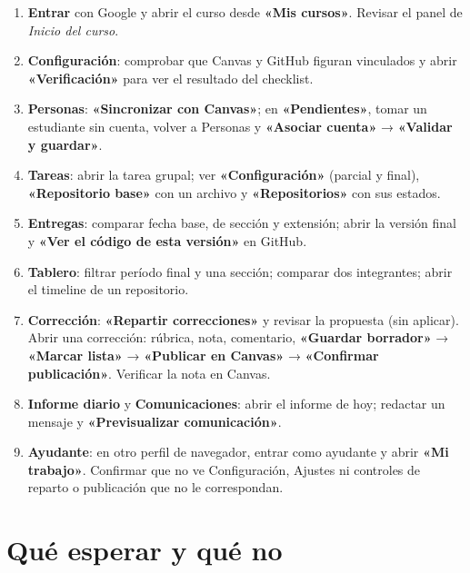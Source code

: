 \documentclass[11pt,a4paper]{article}
\newcommand{\ui}[1]{\textbf{«#1»}}        %
\begin{document}
\begin{enumerate}[label=\arabic*., itemsep=4pt]
  \item \textbf{Entrar} con Google y abrir el curso desde \ui{Mis cursos}. Revisar el panel de \emph{Inicio del curso}.
  \item \textbf{Configuración}: comprobar que Canvas y GitHub figuran vinculados y abrir \ui{Verificación} para ver el resultado del checklist.
  \item \textbf{Personas}: \ui{Sincronizar con Canvas}; en \ui{Pendientes}, tomar un estudiante sin cuenta, volver a Personas y \ui{Asociar cuenta} → \ui{Validar y guardar}.
  \item \textbf{Tareas}: abrir la tarea grupal; ver \ui{Configuración} (parcial y final), \ui{Repositorio base} con un archivo y \ui{Repositorios} con sus estados.
  \item \textbf{Entregas}: comparar fecha base, de sección y extensión; abrir la versión final y \ui{Ver el código de esta versión} en GitHub.
  \item \textbf{Tablero}: filtrar período final y una sección; comparar dos integrantes; abrir el timeline de un repositorio.
  \item \textbf{Corrección}: \ui{Repartir correcciones} y revisar la propuesta (sin aplicar). Abrir una corrección: rúbrica, nota, comentario, \ui{Guardar borrador} → \ui{Marcar lista} → \ui{Publicar en Canvas} → \ui{Confirmar publicación}. Verificar la nota en Canvas.
  \item \textbf{Informe diario} y \textbf{Comunicaciones}: abrir el informe de hoy; redactar un mensaje y \ui{Previsualizar comunicación}.
  \item \textbf{Ayudante}: en otro perfil de navegador, entrar como ayudante y abrir \ui{Mi trabajo}. Confirmar que no ve Configuración, Ajustes ni controles de reparto o publicación que no le correspondan.
\end{enumerate}

\section{Qué esperar y qué no}
\end{document}
